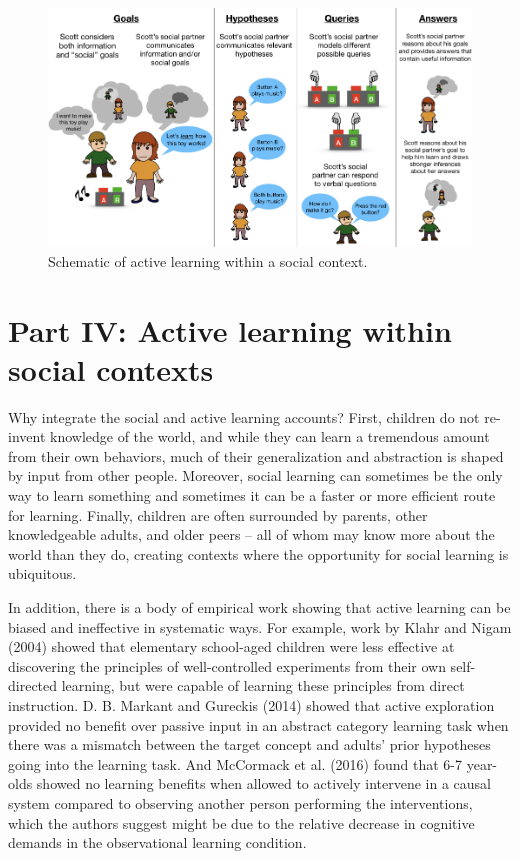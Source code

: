 \documentclass[english,floatsintext,man]{apa6}
\newcounter{author}
\theoremstyle{definition}
\theoremstyle{definition}
\theoremstyle{definition}
\theoremstyle{remark}
\begin{document}
\begin{figure}[tb]
\includegraphics[width=1\linewidth]{macdonald_cada_files/figure-latex/unnamed-chunk-2-1} \caption{Schematic of active learning within a social context.}\label{fig:unnamed-chunk-2}
\end{figure}

\section{Part IV: Active learning within social
contexts}\label{part-iv-active-learning-within-social-contexts}

Why integrate the social and active learning accounts? First, children
do not re-invent knowledge of the world, and while they can learn a
tremendous amount from their own behaviors, much of their generalization
and abstraction is shaped by input from other people. Moreover, social
learning can sometimes be the only way to learn something and sometimes
it can be a faster or more efficient route for learning. Finally,
children are often surrounded by parents, other knowledgeable adults,
and older peers -- all of whom may know more about the world than they
do, creating contexts where the opportunity for social learning is
ubiquitous.

In addition, there is a body of empirical work showing that active
learning can be biased and ineffective in systematic ways. For example,
work by Klahr and Nigam (2004) showed that elementary school-aged
children were less effective at discovering the principles of
well-controlled experiments from their own self-directed learning, but
were capable of learning these principles from direct instruction. D. B.
Markant and Gureckis (2014) showed that active exploration provided no
benefit over passive input in an abstract category learning task when
there was a mismatch between the target concept and adults' prior
hypotheses going into the learning task. And McCormack et al. (2016)
found that 6-7 year-olds showed no learning benefits when allowed to
actively intervene in a causal system compared to observing another
person performing the interventions, which the authors suggest might be
due to the relative decrease in cognitive demands in the observational
learning condition.
\end{document}
